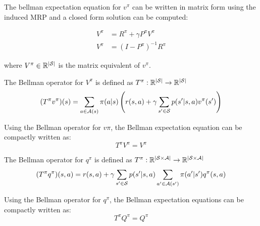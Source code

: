 The bellman expectation equation for $v^\pi$ can be written in matrix form using the induced MRP and a closed form solution can be computed:

\begin{align*}
    V^\pi &= R^\pi + \gamma P^\pi V^\pi \\
    V^\pi &= (I - P^\pi)^{-1} R^\pi
\end{align*}

where $V^\pi \in \mathbb{R}^{|\mathcal{S}|}$ is the matrix equivalent of $v^\pi$.


\begin{definition}
    The Bellman operator for $V^\pi$ is defined as $T^\pi : \mathbb{R}^{|\mathcal{S}|} \to \mathbb{R}^{|\mathcal{S}|}$
    \[(T^\pi v^\pi)(s) = \sum_{a \in \mathcal{A}(s)}\pi(a|s)\left(r(s,a) + \gamma \sum_{s' \in \mathcal{S}}p(s'|s,a)v^\pi(s')\right)\]
\end{definition}

Using the Bellman operator for $v\pi$, the Bellman expectation equation can be compactly written as:
\begin{equation*}
    T^\pi V^\pi = V^\pi
\end{equation*}


\begin{definition}
    The Bellman operator for $q^\pi$ is defined as $T^\pi : \mathbb{R}^{|\mathcal{S} \times \mathcal{A}|} \to \mathbb{R}^{|\mathcal{S} \times \mathcal{A}|}$
    \[(T^\pi q^\pi)(s, a) = r(s,a) + \gamma \sum_{s' \in \mathcal{S}}p(s'|s,a)\sum_{a' \in \mathcal{A}(s')}\pi(a'|s')q^\pi(s,a)\]
\end{definition}

Using the Bellman operator for $q^\pi$, the Bellman expectation equations can be compactly written as:
\begin{equation*}
    T^\pi Q^\pi = Q^\pi
\end{equation*}


